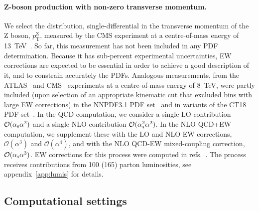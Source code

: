 \paragraph{Z-boson production with non-zero transverse momentum.}
We select the distribution, single-differential in the transverse momentum of
the Z boson, $p_\mathrm{T}^\mathrm{Z}$, measured by the CMS experiment at a centre-of-mass
energy of \SI{13}{\tera\electronvolt}~\cite{Sirunyan:2019bzr}. So far, this measurement has not been
included in any PDF determination. Because it has sub-percent experimental uncertainties,
EW corrections are expected to be essential in order to achieve a good
description of it, and to constrain accurately the PDFs. Analogous measurements,
from the ATLAS~\cite{Aad:2015auj} and CMS~\cite{Khachatryan:2015oaa}
experiments at a centre-of-mass energy of \SI{8}{\tera\electronvolt}, were partly included (upon
selection of an appropriate kinematic cut that excluded bins with large EW
corrections) in the NNPDF3.1 PDF set~\cite{Ball:2017nwa} and in variants of
the CT18 PDF set~\cite{Hou:2019efy}. In the QCD computation, we consider a
single LO contribution $\mathcal{O}(\alpha_\mathrm{s}\alpha^2)$ and a single NLO
contribution $\mathcal{O}(\alpha_\mathrm{s}^2\alpha^2)$. In the NLO QCD+EW computation,
we supplement these with the LO and NLO EW corrections,
$\mathcal{O}(\alpha^3)$ and $\mathcal{O}(\alpha^4)$, and with the NLO
QCD-EW mixed-coupling correction, $\mathcal{O}(\alpha_\mathrm{s}\alpha^3)$. EW corrections for
this process were computed in
refs.~\cite{Kuhn:2005az,Denner:2011vu,Hollik:2015pja,Kallweit:2015dum}.
The process receives contributions from 100 (165) parton luminosities,
see appendix~\ref{app:lumis} for details.

\subsection{Computational settings}
\label{subsec:computational_settings}

